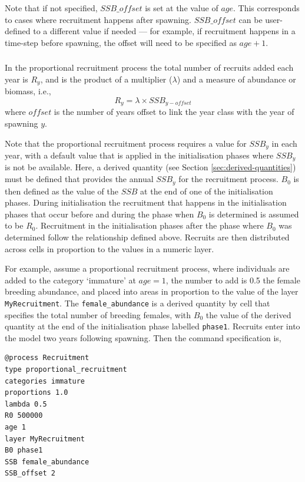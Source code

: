 Note that if not specified, $SSB\_offset$ is set at the value of $age$. This corresponds to cases where recruitment happens after spawning. $SSB\_offset$ can be user-defined to a different value if needed --- for example, if recruitment happens in a time-step before spawning, the offset will need to be specified as $age + 1$.

\subsubsection*{}

In the proportional recruitment process the total number of recruits added each year is $R_y$, and is the product of a multiplier ($\lambda$) and a measure of abundance or biomass, i.e.,
\begin{equation}
  R_y = \lambda \times SSB_{y-offset}
\end{equation}
 where $offset$ is the number of years offset to link the year class with the year of spawning $y$.

Note that the proportional recruitment process requires a value for $SSB_y$ in each year, with a default value that is applied in the initialisation phases where $SSB_y$ is not be available. Here, a derived quantity (see Section \ref{sec:derived-quantities}) must be defined that provides the annual $SSB_y$ for the recruitment process. $B_0$ is then defined as the value of the $SSB$ at the end of one of the initialisation phases. During initialisation the recruitment that happens in the initialisation phases that occur before and during the phase when $B_0$ is determined is assumed to be $R_0$. Recruitment in the initialisation phases after the phase where $B_0$ was determined follow the relationship defined above. Recruits are then distributed across cells in proportion to the values in a numeric layer. 

For example, assume a proportional recruitment process, where individuals are added to the category `immature' at $age=1$, the number to add is 0.5 the female breeding abundance, and placed into areas in proportion to the value of the layer \texttt{MyRecruitment}. The \texttt{female\_abundance} is a derived quantity by cell that specifies the total number of breeding females, with $B_0$ the value of the derived quantity at the end of the initialisation phase labelled \texttt{phase1}. Recruits enter into the model two years following spawning. Then the command specification is,
{\small{\begin{verbatim}
@process Recruitment
type proportional_recruitment
categories immature
proportions 1.0
lambda 0.5
R0 500000
age 1
layer MyRecruitment
B0 phase1
SSB female_abundance
SSB_offset 2
\end{verbatim}}}

